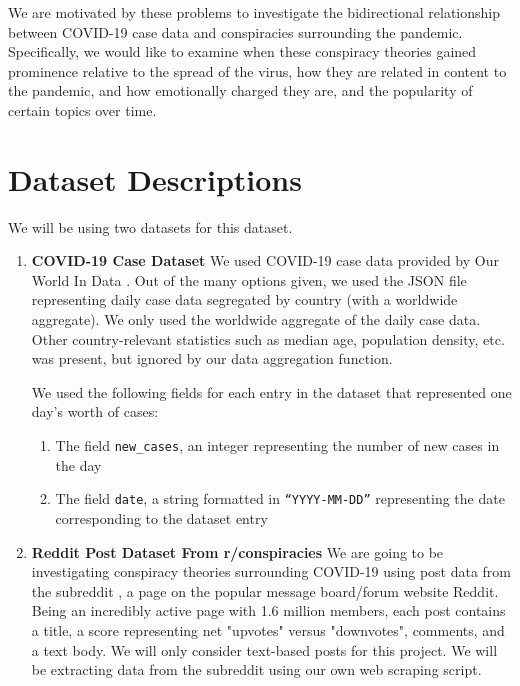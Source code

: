 \documentclass[fontsize=11pt]{article}
\begin{document}
We are motivated by these problems to investigate the bidirectional relationship between COVID-19 case data and conspiracies surrounding the pandemic.  Specifically, we would like to examine when these conspiracy theories gained prominence relative to the spread of the virus, how they are related in content to the pandemic, and how emotionally charged they are, and the popularity of certain topics over time.



\section{Dataset Descriptions}
\label{sec:dataset_descriptions}

We will be using two datasets for this dataset.
\begin{enumerate}
    \item \textbf{COVID-19 Case Dataset} We used COVID-19 case data provided by Our World In Data \cite{covid19d6:online}. Out of the many options given, we used the JSON file representing daily case data segregated by country (with a worldwide aggregate). We only used the worldwide aggregate of the daily case data. Other country-relevant statistics such as median age, population density, etc. was present, but ignored by our data aggregation function.
    
    We used the following fields for each entry in the dataset that represented one day's worth of cases:
    
    \begin{enumerate}
        \item The field \texttt{new\_cases}, an integer representing the number of new cases in the day
        \item The field \texttt{date}, a string formatted in \texttt{``YYYY-MM-DD''} representing the date corresponding to the dataset entry
    \end{enumerate}
    \item \textbf{Reddit Post Dataset From r/conspiracies} We are going to be investigating conspiracy theories surrounding COVID-19 using post data from the subreddit \cite{2conspir6:online}, a page on the popular message board/forum website Reddit. Being an incredibly active page with 1.6 million members, each post contains a title, a score representing net "upvotes" versus "downvotes", comments, and a text body. We will only consider text-based posts for this project. We will be extracting data from the subreddit using our own web scraping script.


\end{enumerate}
\end{document}
